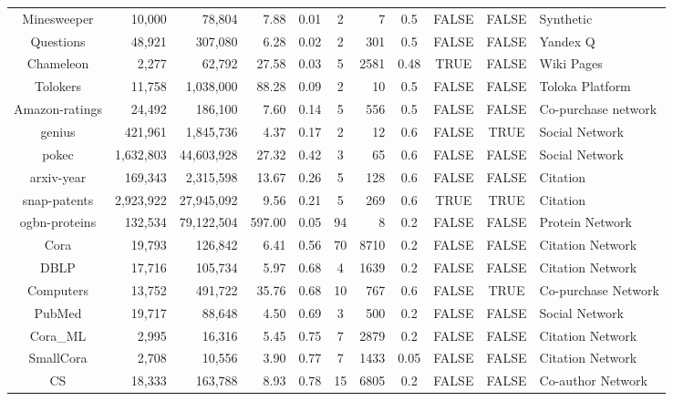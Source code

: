 \begin{table}[!htbp]
\begin{sc}
{\begin{tabular}{@{}crrrccrcccl@{}}
Minesweeper    & 10,000    & 78,804      & 7.88   & 0.01  & 2  & 7    & 0.5  & FALSE & FALSE & Synthetic           \\
Questions      & 48,921    & 307,080     & 6.28   & 0.02  & 2  & 301  & 0.5  & FALSE & FALSE & Yandex Q            \\
Chameleon      & 2,277     & 62,792      & 27.58  & 0.03  & 5  & 2581 & 0.48 & TRUE  & FALSE & Wiki Pages          \\
Tolokers       & 11,758    & 1,038,000   & 88.28  & 0.09  & 2  & 10   & 0.5  & FALSE & FALSE & Toloka Platform     \\
Amazon-ratings & 24,492    & 186,100     & 7.60   & 0.14  & 5  & 556  & 0.5  & FALSE & FALSE & Co-purchase network \\
genius         & 421,961   & 1,845,736   & 4.37   & 0.17  & 2  & 12   & 0.6  & FALSE & TRUE  & Social Network      \\
pokec          & 1,632,803 & 44,603,928  & 27.32  & 0.42  & 3  & 65   & 0.6  & FALSE & FALSE & Social Network      \\
arxiv-year     & 169,343   & 2,315,598   & 13.67  & 0.26  & 5  & 128  & 0.6  & FALSE & FALSE & Citation            \\
snap-patents   & 2,923,922 & 27,945,092  & 9.56   & 0.21  & 5  & 269  & 0.6  & TRUE  & TRUE  & Citation            \\
ogbn-proteins  & 132,534   & 79,122,504  & 597.00 & 0.05  & 94 & 8    & 0.2  & FALSE & FALSE & Protein Network     \\\midrule \midrule
Cora           & 19,793    & 126,842     & 6.41   & 0.56  & 70 & 8710 & 0.2  & FALSE & FALSE & Citation Network    \\
DBLP           & 17,716    & 105,734     & 5.97   & 0.68  & 4  & 1639 & 0.2  & FALSE & FALSE & Citation Network    \\
Computers      & 13,752    & 491,722     & 35.76  & 0.68  & 10 & 767  & 0.6  & FALSE & TRUE  & Co-purchase Network \\
PubMed         & 19,717    & 88,648      & 4.50   & 0.69  & 3  & 500  & 0.2  & FALSE & FALSE & Social Network      \\
Cora\_ML        & 2,995     & 16,316      & 5.45   & 0.75  & 7  & 2879 & 0.2  & FALSE & FALSE & Citation Network    \\
SmallCora      & 2,708     & 10,556      & 3.90   & 0.77  & 7  & 1433 & 0.05 & FALSE & FALSE & Citation Network    \\
CS             & 18,333    & 163,788     & 8.93   & 0.78  & 15 & 6805 & 0.2  & FALSE & FALSE & Co-author Network   \\

\end{tabular}}
\end{sc}
\end{table}
